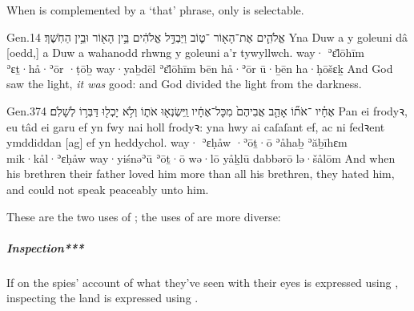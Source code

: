 
\begin{paper}
	{\click} When  is complemented by a  ‘that’ phrase, only  is selectable.
\end{paper}

\begin{example}{Gen.}{1}{4}{}{}
	\quoling
	{ אֱלֹהִ֛ים אֶת־הָא֖וֹר ־ט֑וֹב וַיַּבְדֵּ֣ל אֱלֹהִ֔ים בֵּ֥ין הָא֖וֹר וּבֵ֥ין הַחֹֽשֶׁךְ׃}
	{Yna Duw a  y goleuni  dâ [oedd,] a Duw a wahanodd rhwng y goleuni a’r tywyllwch.}
	{way· ʾɛ̆lōhīm ʾɛṯ·hå·ʾōr ·ṭōḇ way·yaḇdēl ʾɛ̆lōhīm bēn hå·ʾōr ū·ḇēn ha·ḥōšɛḵ}
	{And God saw the light,  \emph{it was} good: and God divided the light from the darkness.}
\end{example}

\begin{example}{Gen.}{37}{4}{}{}
	\quoling
	{ אֶחָ֗יו ־אֹת֞וֹ אָהַ֤ב אֲבִיהֶם֙ מִכָּל־אֶחָ֔יו וַֽיִּשְׂנְא֖וּ אֹת֑וֹ וְלֹ֥א יָכְל֖וּ דַּבְּר֥וֹ לְשָׁלֹֽם׃}
	{Pan  ei frodyꝛ,  eu tâd  ei garu ef yn fwy nai holl frodyꝛ: yna hwy ai caſaſant ef, ac ni fedꝛent ymddiddan [ag] ef yn heddychol.}
	{way· ʾɛḥåw ·ʾōṯ·ō ʾåhaḇ ʾăḇīhɛm mik·kål·ʾɛḥåw way·yiśnəʾū ʾōṯ·ō wə·lō yåḵlū dabbərō lə·šålōm}
	{And when his brethren   their father loved him more than all his brethren, they hated him, and could not speak peaceably unto him.}
\end{example}

\begin{paper}
	{\click}{\click} These are the two uses of ; the uses of  are more diverse:
\end{paper}



\paragraph{}

\subparagraph{Inspection*** }

\begin{paper}
	If on  the spies’ account of what they’ve seen with their eyes is expressed using , inspecting \tounfold{***} the land is expressed using .
\end{paper}

